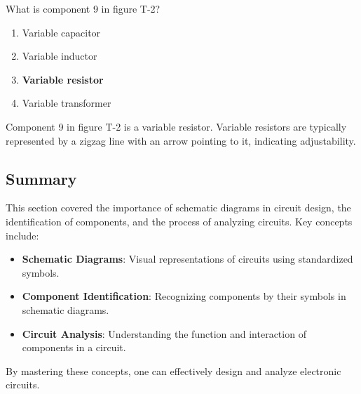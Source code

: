 \begin{tcolorbox}[colback=gray!10!white,colframe=black!75!black,title={T6C08}]
    What is component 9 in figure T-2?
    \begin{enumerate}[label=\Alph*,noitemsep]
        \item Variable capacitor
        \item Variable inductor
        \item \textbf{Variable resistor}
        \item Variable transformer
    \end{enumerate}
\end{tcolorbox}
Component 9 in figure T-2 is a variable resistor. Variable resistors are typically represented by a zigzag line with an arrow pointing to it, indicating adjustability.


\subsection*{Summary}
This section covered the importance of schematic diagrams in circuit design, the identification of components, and the process of analyzing circuits. Key concepts include:

\begin{itemize}
    \item \textbf{Schematic Diagrams}: Visual representations of circuits using standardized symbols.
    \item \textbf{Component Identification}: Recognizing components by their symbols in schematic diagrams.
    \item \textbf{Circuit Analysis}: Understanding the function and interaction of components in a circuit.
\end{itemize}

By mastering these concepts, one can effectively design and analyze electronic circuits.
